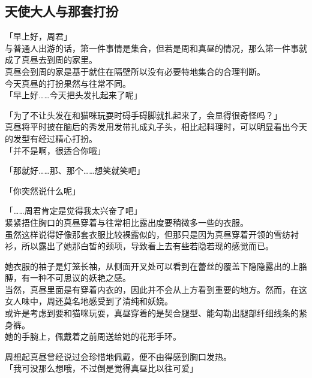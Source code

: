 \subsection{天使大人与那套打扮}

「早上好，周君」\\

与普通人出游的话，第一件事情是集合，但若是周和真昼的情况，那么第一件事就成了真昼去到周的家里。\\

真昼会到周的家是基于就住在隔壁所以没有必要特地集合的合理判断。\\

今天真昼的打扮果然与往常不同。\\

「早上好……今天把头发扎起来了呢」

「为了不让头发在和猫咪玩耍时碍手碍脚就扎起来了，会显得很奇怪吗？」\\

真昼将平时披在脑后的秀发用发带扎成丸子头，相比起料理时，可以明显看出今天的发型有经过精心打扮。\\

「并不是啊，很适合你哦」

「那就好……那、那个……想笑就笑吧」

「你突然说什么呢」

「……周君肯定是觉得我太兴奋了吧」\\

紧紧捂住胸口的真昼穿着与往常相比露出度要稍微多一些的衣服。\\

虽然这样说得好像那套衣服比较裸露似的，但那只是因为真昼穿着开领的雪纺衬衫，所以露出了她那白皙的颈项，导致看上去有些若隐若现的感觉而已。

她衣服的袖子是灯笼长袖，从侧面开叉处可以看到在蕾丝的覆盖下隐隐露出的上胳膊，有一种不可思议的妖艳之感。\\

当然，真昼里面是有穿着内衣的，因此并不会从上方看到重要的地方。然而，在这女人味中，周还莫名地感受到了清纯和妖娆。\\

或许是考虑到要和猫咪玩耍，真昼穿着的是契合腿型、能勾勒出腿部纤细线条的紧身裤。\\

她的手腕上，佩戴着之前周送给她的花形手环。

周想起真昼曾经说过会珍惜地佩戴，便不由得感到胸口发热。\\

「我可没那么想哦，不过倒是觉得真昼比以往可爱」

